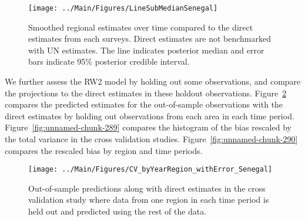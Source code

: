 \documentclass[12pt]{article}\usepackage[]{graphicx}\usepackage[]{color}
\newenvironment{knitrout}{}{} %
\begin{document}
\begin{knitrout}
\color{fgcolor}\begin{figure}[bht]

{\centering \texttt{[image: ../Main/Figures/LineSubMedianSenegal]} 

}

\caption[Smoothed regional estimates over time compared to the direct estimates from each surveys]{Smoothed regional estimates over time compared to the direct estimates from each surveys. Direct estimates are not benchmarked with UN estimates. The line indicates posterior median and error bars indicate 95\% posterior credible interval.}\label{fig:unnamed-chunk-287}
\end{figure}


\end{knitrout}
We further assess the RW2 model by holding out some observations, and compare the projections to the direct estimates in these holdout observations. Figure~\ref{fig:unnamed-chunk-288} compares the predicted estimates for the out-of-sample observations  with the direct estimates by holding out observations from each area in each time period.  Figure~\ref{fig:unnamed-chunk-289} compares the histogram of the bias rescaled by the total variance in the cross validation studies. Figure~\ref{fig:unnamed-chunk-290} compares the rescaled bias by region and time periods.



 
\begin{knitrout}
\color{fgcolor}\begin{figure}[bht]

{\centering \texttt{[image: ../Main/Figures/CV\_byYearRegion\_withError\_Senegal]} 

}

\caption[Out-of-sample predictions along with direct estimates in the cross validation study where data from one region in each time period is held out and predicted using the rest of the data]{Out-of-sample predictions along with direct estimates in the cross validation study where data from one region in each time period is held out and predicted using the rest of the data.}\label{fig:unnamed-chunk-288}
\end{figure}


\end{knitrout}
\end{document}
